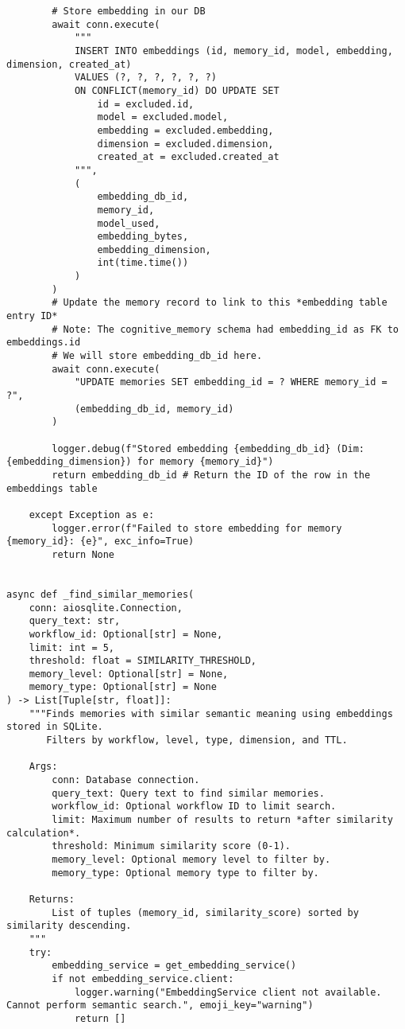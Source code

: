 \documentclass[12pt,a4paper]{article}
\begin{document}
\begin{pageablecode}
\begin{verbatim}
        # Store embedding in our DB
        await conn.execute(
            """
            INSERT INTO embeddings (id, memory_id, model, embedding, dimension, created_at)
            VALUES (?, ?, ?, ?, ?, ?)
            ON CONFLICT(memory_id) DO UPDATE SET
                id = excluded.id,
                model = excluded.model,
                embedding = excluded.embedding,
                dimension = excluded.dimension,
                created_at = excluded.created_at
            """,
            (
                embedding_db_id,
                memory_id,
                model_used,
                embedding_bytes,
                embedding_dimension,
                int(time.time())
            )
        )
        # Update the memory record to link to this *embedding table entry ID*
        # Note: The cognitive_memory schema had embedding_id as FK to embeddings.id
        # We will store embedding_db_id here.
        await conn.execute(
            "UPDATE memories SET embedding_id = ? WHERE memory_id = ?",
            (embedding_db_id, memory_id)
        )

        logger.debug(f"Stored embedding {embedding_db_id} (Dim: {embedding_dimension}) for memory {memory_id}")
        return embedding_db_id # Return the ID of the row in the embeddings table

    except Exception as e:
        logger.error(f"Failed to store embedding for memory {memory_id}: {e}", exc_info=True)
        return None


async def _find_similar_memories(
    conn: aiosqlite.Connection,
    query_text: str,
    workflow_id: Optional[str] = None,
    limit: int = 5,
    threshold: float = SIMILARITY_THRESHOLD,
    memory_level: Optional[str] = None,
    memory_type: Optional[str] = None
) -> List[Tuple[str, float]]:
    """Finds memories with similar semantic meaning using embeddings stored in SQLite.
       Filters by workflow, level, type, dimension, and TTL.

    Args:
        conn: Database connection.
        query_text: Query text to find similar memories.
        workflow_id: Optional workflow ID to limit search.
        limit: Maximum number of results to return *after similarity calculation*.
        threshold: Minimum similarity score (0-1).
        memory_level: Optional memory level to filter by.
        memory_type: Optional memory type to filter by.

    Returns:
        List of tuples (memory_id, similarity_score) sorted by similarity descending.
    """
    try:
        embedding_service = get_embedding_service()
        if not embedding_service.client:
            logger.warning("EmbeddingService client not available. Cannot perform semantic search.", emoji_key="warning")
            return []


\end{verbatim}
\end{pageablecode}
\end{document}
